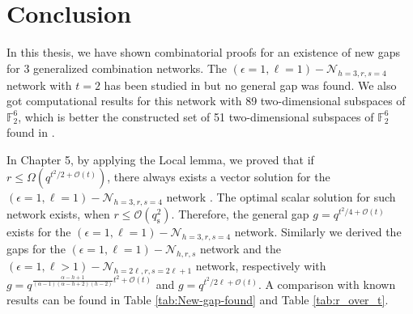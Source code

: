 \chapter{Conclusion} \label{chap:conclusion}

In this thesis, we have shown combinatorial proofs for an existence
of new gaps for 3 generalized combination networks. The $\left(\epsilon=1,\ell=1\right)-\mathcal{N}_{h=3,r,s=4}$
network with $t=2$ has been studied in \cite{Wachter-Zeh:2018,Etzion:2016,Zhang:2019,Etzion:2018}
but no general gap was found. We also got computational results for
this network with 89 two-dimensional subspaces of $\ensuremath{\mathbb{F}}_{2}^{6}$,
which is better the constructed set of 51 two-dimensional subspaces
of $\ensuremath{\mathbb{F}}_{2}^{6}$ found in \cite{Wachter-Zeh:2018}.

In Chapter 5, by applying the Local lemma, we proved that if $r\leq\Omega\left(q^{t^{2}/2+\mathcal{O}\left(t\right)}\right)$,
there always exists a vector solution for the $\left(\epsilon=1,\ell=1\right)-\mathcal{N}_{h=3,r,s=4}$
network . The optimal scalar solution for such network exists, when
$r\leq\mathcal{O}\left(q_{\mathrm{s}}^{2}\right)$. Therefore, the
general gap $g=q^{t^{2}/4+\mathcal{O}(t)}$ exists for the $\left(\epsilon=1,\ell=1\right)-\mathcal{N}_{h=3,r,s=4}$
network. Similarly we derived the gaps for the $\left(\epsilon=1,\ell=1\right)-\mathcal{N}_{h,r,s}$
network and the $\left(\epsilon=1,\ell>1\right)-\mathcal{N}_{h=2\ell,r,s=2\ell+1}$
network, respectively with $g=q^{\frac{\alpha-h+1}{\left(\alpha-1\right)\left(\alpha-h+2\right)\left(h-2\right)}t^{2}+\mathcal{O}(t)}$
and $g=q^{t^{2}/2\ell+\mathcal{O}(t)}$. A comparison with known results
can be found in Table \ref{tab:New-gap-found} and Table \ref{tab:r_over_t}.

